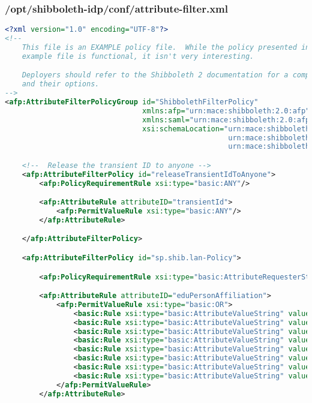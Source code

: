 \subsubsection{/opt/shibboleth-idp/conf/attribute-filter.xml}
\begin{lstlisting}[language=xml]
<?xml version="1.0" encoding="UTF-8"?>
<!--
    This file is an EXAMPLE policy file.  While the policy presented in this
    example file is functional, it isn't very interesting.

    Deployers should refer to the Shibboleth 2 documentation for a complete list of components
    and their options.
-->
<afp:AttributeFilterPolicyGroup id="ShibbolethFilterPolicy"
                                xmlns:afp="urn:mace:shibboleth:2.0:afp" xmlns:basic="urn:mace:shibboleth:2.0:afp:mf:basic"
                                xmlns:saml="urn:mace:shibboleth:2.0:afp:mf:saml" xmlns:xsi="http://www.w3.org/2001/XMLSchema-instance"
                                xsi:schemaLocation="urn:mace:shibboleth:2.0:afp classpath:/schema/shibboleth-2.0-afp.xsd
                                                    urn:mace:shibboleth:2.0:afp:mf:basic classpath:/schema/shibboleth-2.0-afp-mf-basic.xsd
                                                    urn:mace:shibboleth:2.0:afp:mf:saml classpath:/schema/shibboleth-2.0-afp-mf-saml.xsd">

    <!--  Release the transient ID to anyone -->
    <afp:AttributeFilterPolicy id="releaseTransientIdToAnyone">
        <afp:PolicyRequirementRule xsi:type="basic:ANY"/>

        <afp:AttributeRule attributeID="transientId">
            <afp:PermitValueRule xsi:type="basic:ANY"/>
        </afp:AttributeRule>

    </afp:AttributeFilterPolicy>

    <afp:AttributeFilterPolicy id="sp.shib.lan-Policy">

        <afp:PolicyRequirementRule xsi:type="basic:AttributeRequesterString" value="https://sp.shib.lan/shibboleth" />

        <afp:AttributeRule attributeID="eduPersonAffiliation">
            <afp:PermitValueRule xsi:type="basic:OR">
                <basic:Rule xsi:type="basic:AttributeValueString" value="faculty" ignoreCase="true" />
                <basic:Rule xsi:type="basic:AttributeValueString" value="student" ignoreCase="true" />
                <basic:Rule xsi:type="basic:AttributeValueString" value="staff" ignoreCase="true" />
                <basic:Rule xsi:type="basic:AttributeValueString" value="alum" ignoreCase="true" />
                <basic:Rule xsi:type="basic:AttributeValueString" value="member" ignoreCase="true" />
                <basic:Rule xsi:type="basic:AttributeValueString" value="affiliate" ignoreCase="true" />
                <basic:Rule xsi:type="basic:AttributeValueString" value="employee" ignoreCase="true" />
                <basic:Rule xsi:type="basic:AttributeValueString" value="library-walk-in" ignoreCase="true" />
            </afp:PermitValueRule>
        </afp:AttributeRule>


\end{lstlisting}
